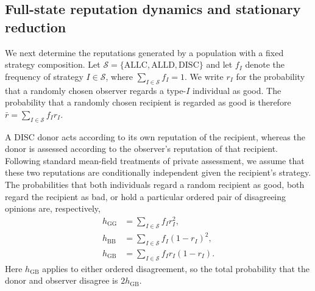 \documentclass[fleqn,10pt]{wlscirep}
\begin{document}
\subsection{Full-state reputation dynamics and stationary reduction}
\label{sec:si-reputation-dynamics}
\label{sec:si-full-state-dynamics}

We next determine the reputations generated by a population with a fixed strategy composition. Let $\mathcal S=\{\mathrm{ALLC},\mathrm{ALLD},\mathrm{DISC}\}$ and let $f_I$ denote the frequency of strategy $I\in\mathcal S$, where $\sum_{I\in\mathcal S}f_I=1$. We write $r_I$ for the probability that a randomly chosen observer regards a type-$I$ individual as good. The probability that a randomly chosen recipient is regarded as good is therefore $\bar r=\sum_{I\in\mathcal S}f_Ir_I$.

A $\mathrm{DISC}$ donor acts according to its own reputation of the recipient, whereas the donor is assessed according to the observer's reputation of that recipient. Following standard mean-field treatments of private assessment, we assume that these two reputations are conditionally independent given the recipient's strategy. The probabilities that both individuals regard a random recipient as good, both regard the recipient as bad, or hold a particular ordered pair of disagreeing opinions are, respectively,
\begin{equation}
\begin{aligned}
h_{\mathrm{GG}}&=\sum_{I\in\mathcal S}f_Ir_I^2,\\
h_{\mathrm{BB}}&=\sum_{I\in\mathcal S}f_I(1-r_I)^2,\\
h_{\mathrm{GB}}&=\sum_{I\in\mathcal S}f_Ir_I(1-r_I).
\end{aligned}
\label{eq:si-private-pairs}
\end{equation}
Here $h_{\mathrm{GB}}$ applies to either ordered disagreement, so the total probability that the donor and observer disagree is $2h_{\mathrm{GB}}$.
\end{document}
